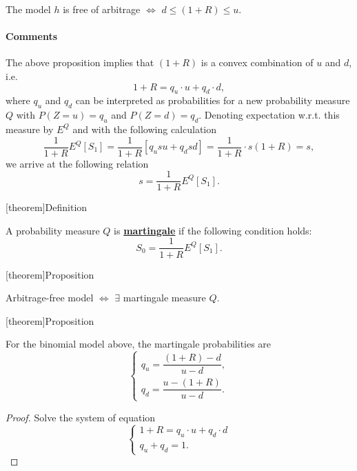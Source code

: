 \documentclass[twocolumn,landscape,10pt]{article}
\theoremstyle{definition}
\begin{document}
\begin{theorem}
    The model $h$ is free of arbitrage $\iff$
    $d\le(1+R)\le u$.
\end{theorem}

\paragraph{Comments} The above proposition implies that $(1+R)$ is a convex
combination of $u$ and $d$, i.e.\
\[
    1+R=q_u\cdot u + q_d\cdot d,
\]
where $q_u$ and $q_d$ can be interpreted as probabilities for a new probability
measure $Q$ with $P(Z=u)=q_u$ and $P(Z=d)=q_d$. Denoting expectation w.r.t. this
measure by $E^Q$ and with the following calculation
\[
    \frac{1}{1+R}E^Q[S_1]=\frac{1}{1+R}[q_usu+q_dsd]=\frac{1}{1+R}\cdot
    s(1+R)=s,
\]
we arrive at the following relation
\[
    s=\frac{1}{1+R}E^Q[S_1].
\]

[theorem]{Definition}
\begin{martingale measure}
    A probability measure $Q$ is \textbf{\underline{martingale}} 
    if the following condition holds:
    \[
        S_0=\frac{1}{1+R}E^Q[S_1].
    \]
\end{martingale measure}

[theorem]{Proposition}
\begin{arbitrage free 1}
    Arbitrage-free model $\iff$ $\exists$ martingale measure $Q$.
\end{arbitrage free 1}

[theorem]{Proposition}
\begin{binomial model martingale}
    For the binomial model above, the martingale probabilities are
    \[
        \begin{cases}
            q_u=\dfrac{(1+R)-d}{u-d}, \\[2ex]
            q_d=\dfrac{u-(1+R)}{u-d}.
        \end{cases}
    \]
\end{binomial model martingale}

\begin{proof}
Solve the system of equation
\[
    \begin{cases}
        1+R=q_u\cdot u+q_d\cdot d\\
        q_u+q_d=1.
    \end{cases}
\]
\end{proof}
\end{document}
